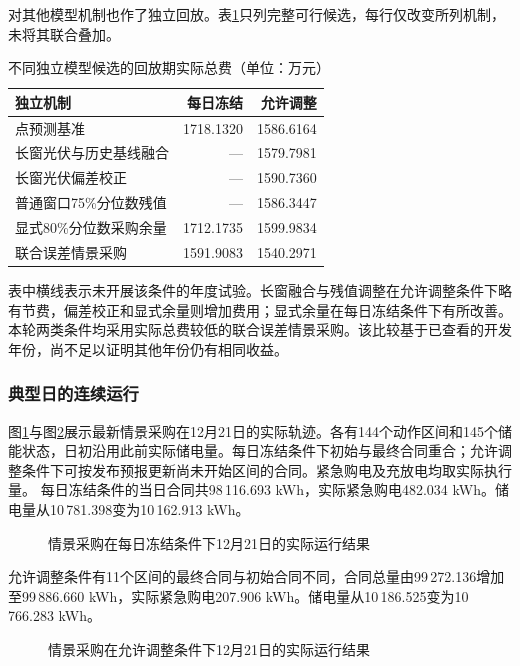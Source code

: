 对其他模型机制也作了独立回放。表\ref{tab:q4-candidates}只列完整可行候选，每行仅改变所列机制，未将其联合叠加。
\begin{table}[H]\centering\small
\caption{不同独立模型候选的回放期实际总费（单位：万元）}\label{tab:q4-candidates}
\begin{tabular}{lrr}\toprule
独立机制 & 每日冻结 & 允许调整 \\ \midrule
点预测基准 & 1718.1320 & 1586.6164 \\
长窗光伏与历史基线融合 & --- & 1579.7981 \\
长窗光伏偏差校正 & --- & 1590.7360 \\
普通窗口75\%分位数残值 & --- & 1586.3447 \\
显式80\%分位数采购余量 & 1712.1735 & 1599.9834 \\
联合误差情景采购 & 1591.9083 & 1540.2971 \\
\bottomrule\end{tabular}\end{table}
表中横线表示未开展该条件的年度试验。长窗融合与残值调整在允许调整条件下略有节费，偏差校正和显式余量则增加费用；显式余量在每日冻结条件下有所改善。本轮两类条件均采用实际总费较低的联合误差情景采购。该比较基于已查看的开发年份，尚不足以证明其他年份仍有相同收益。

\subsubsection{典型日的连续运行}
图\ref{fig:q4-freeze}与图\ref{fig:q4-adjust}展示最新情景采购在12月21日的实际轨迹。各有144个动作区间和145个储能状态，日初沿用此前实际储电量。每日冻结条件下初始与最终合同重合；允许调整条件下可按发布预报更新尚未开始区间的合同。紧急购电及充放电均取实际执行量。
每日冻结条件的当日合同共98\,116.693 kWh，实际紧急购电482.034 kWh。储电量从10\,781.398变为10\,162.913 kWh。
\begin{figure}[!htbp]\centering
{}
\caption{情景采购在每日冻结条件下12月21日的实际运行结果}\label{fig:q4-freeze}
\end{figure}
允许调整条件有11个区间的最终合同与初始合同不同，合同总量由99\,272.136增加至99\,886.660 kWh，实际紧急购电207.906 kWh。储电量从10\,186.525变为10\,766.283 kWh。
\begin{figure}[!htbp]\centering
{}
\caption{情景采购在允许调整条件下12月21日的实际运行结果}\label{fig:q4-adjust}
\end{figure}
